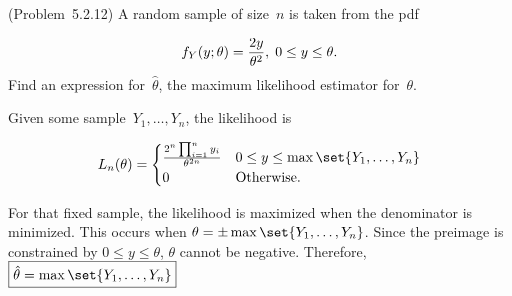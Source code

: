 \begin{problem}
  (\textnormal{Problem~5.2.12}) A random sample of size~$n$ is taken from the pdf

  \begin{equation}\label{eq:P06}
    f_{Y}(y;\theta) = \frac{2y}{\theta^2}, \hspace{0.1cm} 0 \leq y \leq \theta\text{.}
  \end{equation}
  Find an expression for~$\hat{\theta}$, the maximum likelihood estimator for~$\theta$.
\end{problem}

Given some sample~${Y_1,\ldots,Y_n}$, the likelihood is

\begin{equation}\label{eq:P06:Likelihood}
  L_n(\theta) = \begin{cases}
    \frac{2^n \prod_{i=1}^n y_i}{\theta^{2n}} & 0 \leq y \leq \max\set{Y_1,\ldots,Y_n} \\
                  0 & \text{Otherwise}\text{.}
                \end{cases}
\end{equation}

\noindent
For that fixed sample, the likelihood is maximized when the denominator is minimized.  This occurs when ${\theta = \pm\max\set{Y_1,\ldots,Y_n}}$.  Since the preimage is constrained by ${0 \leq y \leq \theta}$, $\theta$ cannot be negative.  Therefore, $\boxed{{\hat{\theta} = \max\set{Y_1,\ldots,Y_n}}}$


